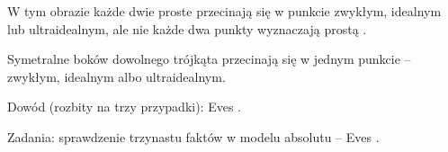 W tym obrazie każde dwie proste przecinają się w punkcie zwykłym, idealnym lub ultraidealnym, ale nie każde dwa punkty wyznaczają prostą \cite[s. 307]{eves1_1972}. %

\begin{theorem}
	Symetralne boków dowolnego trójkąta przecinają się w jednym punkcie -- zwykłym, idealnym albo ultraidealnym. %
\end{theorem}

Dowód (rozbity na trzy przypadki): Eves \cite[s. 308--311]{eves1_1972}. %

Zadania: sprawdzenie trzynastu faktów w modelu absolutu -- Eves \cite[s. 307--308]{eves1_1972}. %

